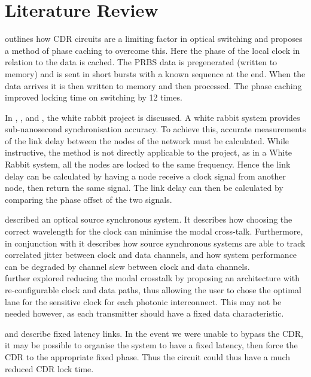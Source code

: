 \section{Literature Review}%
\label{sec:literature_review}

\noindent \cite{kari_phase} outlines how CDR circuits are a limiting factor in
optical switching and proposes a method of phase caching to overcome this.
Here the phase of the local clock in relation to the data is cached.  The PRBS
data is pregenerated (written to memory) and is sent in short bursts with a
known sequence at the end. When the data arrives it is then written to memory
and then processed.  The phase caching improved locking time on switching by 12
times.

\noindent In \cite{serrano2013white}, \cite{moreira2010digital}, and
\cite{moreira2009white}, the white rabbit project is discussed. A white rabbit
system provides sub-nanosecond synchronisation accuracy. To achieve this,
accurate measurements of the link delay between the nodes of the network must
be calculated.  While instructive, the method is not directly applicable to the
project, as in a White Rabbit system, all the nodes are locked to the same
frequency. Hence the link delay can be calculated by having a node receive a
clock signal from another node, then return the same signal. The link delay can
then be calculated by comparing the phase offset of the two signals.

\noindent \cite{williams2016source} described an optical source synchronous
system. It describes how choosing the correct wavelength for the clock can
minimise the modal cross-talk. Furthermore, in conjunction with
\cite{ragab2011receiver} it describes how source synchronous systems are able
to track correlated jitter between clock and data channels, and how system
performance can be degraded by channel slew between clock and data channels.\\
\cite{williams2019reconfiguration} further explored reducing the modal
crosstalk by proposing an architecture with re-configurable clock and data
paths, thus allowing the user to chose the optimal lane for the sensitive clock
for each photonic interconnect. This may not be needed however, as each
transmitter should have a fixed data characteristic.

\noindent \cite{chen2017optimization} and \cite{fixed_latency} describe fixed
latency links. In the event we were unable to bypass the CDR, it may be
possible to organise the system to have a fixed latency, then force the CDR to
the appropriate fixed phase. Thus the circuit could thus have a much reduced
CDR lock time.

